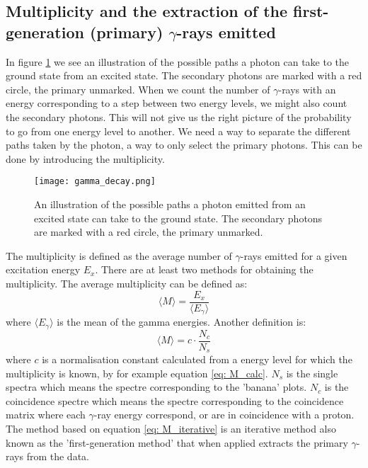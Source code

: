 \documentclass[11pt,a4wide]{article}
\begin{document}
\subsection{Multiplicity and the extraction of the first-generation (primary) $\gamma$-rays emitted}
In figure \ref{fig: gamma_decay} we see an illustration of the possible paths a photon can take to the ground state from an excited state. The secondary photons are marked with a red circle, the primary unmarked. When we count the number of $\gamma$-rays with an energy corresponding to a step between two energy levels, we might also count the secondary photons. This will not give us the right picture of the probability to go from one energy level to another. We need a way to separate the different paths taken by the photon, a way to only select the primary photons. This can be done by introducing the multiplicity. 

\begin{figure}[htp]
\centering
\texttt{[image: gamma\_decay.png]}
\caption{An illustration of the possible paths a photon emitted from an excited state can take to the ground state. The secondary photons are marked with a red circle, the primary unmarked.}
\label{fig: gamma_decay}
\end{figure}

The multiplicity is defined as the average number of $\gamma$-rays emitted for a given excitation energy $E_x$. There are at least two methods for obtaining the multiplicity. The average multiplicity can be defined as:
\begin{equation}
\langle M \rangle = \frac{E_x}{\langle E_\gamma \rangle}
\label{eq: M_calc}
\end{equation}
where $\langle E_\gamma \rangle$ is the mean of the gamma energies. Another definition is:
\begin{equation}
\langle M \rangle = c \cdot \frac{N_c}{N_s}
\label{eq: M_iterative}
\end{equation}
where $c$ is a normalisation constant calculated from a energy level for which the multiplicity is known, by for example equation \ref{eq: M_calc}. $N_s$ is the single spectra which means the spectre corresponding to the 'banana' plots. $N_c$ is the coincidence spectre which means the spectre corresponding to the coincidence matrix where each $\gamma$-ray energy correspond, or are in coincidence with a proton. The method based on equation \ref{eq: M_iterative} is an iterative method also known as the 'first-generation method' that when applied extracts the primary $\gamma$-rays from the data. 
\end{document}
